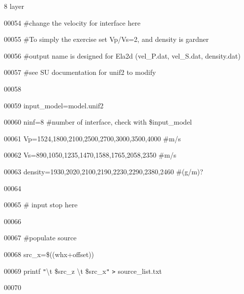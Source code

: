 \documentclass{article}
\begin{document}
\vspace{4pt}
8 layer\label{l00054}

\vspace{4pt}
00054 \#change the velocity for interface here\label{l00055}

\vspace{4pt}
00055 \#To simply the exercise set Vp/Vs=2, and density is gardner\label{l00056}

\vspace{4pt}
00056 \#output name is designed for Ela2d (vel\_P.dat, vel\_S.dat, density.dat)\label{l00057}

\vspace{4pt}
00057 \#see SU documentation for unif2  to modify\label{l00058}

\vspace{4pt}
00058 \label{l00059}

\vspace{4pt}
00059 input\_model=model.unif2\label{l00060}

\vspace{4pt}
00060 ninf=8 \#number of interface, check with \$input\_model\label{l00061}

\vspace{4pt}
00061 Vp=1524,1800,2100,2500,2700,3000,3500,4000 \#m/s\label{l00062}

\vspace{4pt}
00062 Vs=890,1050,1235,1470,1588,1765,2058,2350 \#m/s\label{l00063}

\vspace{4pt}
00063 density=1930,2020,2100,2190,2230,2290,2380,2460 \#(g/m)?\label{l00064}

\vspace{4pt}
00064 \label{l00065}

\vspace{4pt}
00065 \# input stop here\label{l00066}

\vspace{4pt}
00066 \label{l00067}

\vspace{4pt}
00067 \#populate source\label{l00068}

\vspace{4pt}
00068 src\_x=\$((whx+offset))\label{l00069}

\vspace{4pt}
00069 printf \texttt{"}\textbackslash{}t \$src\_z \textbackslash{}t \$src\_x\texttt{"} 
\texttt{>} source\_list.txt\label{l00070}

\vspace{4pt}
00070 \label{l00071}
\end{document}
